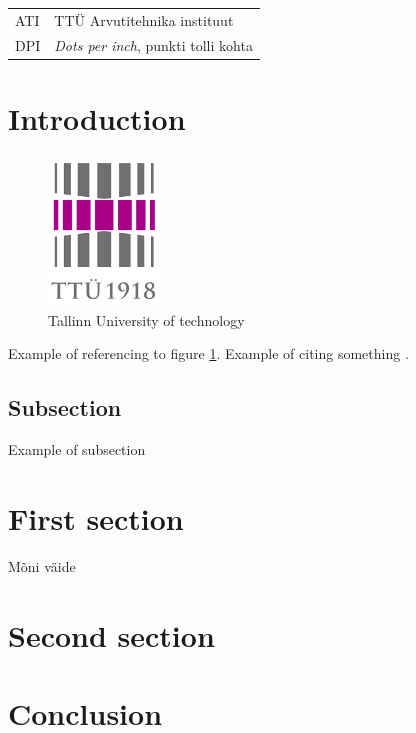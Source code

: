 \documentclass[a4paper, 12pt]{article}
\let\stdsection\section
\renewcommand\section{\newpage\stdsection}
\begin{document}
\begin{tabular}{p{3cm}p{11cm}}
ATI&TTÜ Arvutitehnika instituut\\
DPI&\textit{Dots per inch}, punkti tolli kohta

\end{tabular}
\pagebreak
\tableofcontents
\newpage
\listoffigures
\pagebreak
\listoftables
\pagebreak
\section{Introduction}
\label{Introduction} %
\begin{figure}[h]
	\centering
	\includegraphics[width=3cm]{img/example.png} %
	\caption{Tallinn University of technology \cite{urlSource}}
	\label{fig:ttuExample}
\end{figure}

Example of referencing to figure \ref{fig:ttuExample}. Example of citing something \cite{urlSource}.

\subsection{Subsection}
Example of subsection

\section{First section}
Mõni väide \cite{10.1136/amiajnl-2011-000217}
\section{Second section}
\section{Conclusion}
\label{Conclusion} 
\pagebreak


\footnotesize
{}
\end{document}
